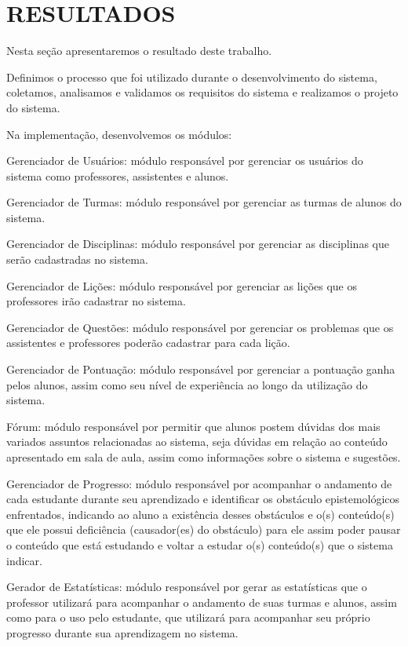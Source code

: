 \chapter{RESULTADOS}
\label{chap:resultados}

Nesta seção apresentaremos o resultado deste trabalho.

Definimos o processo que foi utilizado durante o desenvolvimento do sistema, coletamos, analisamos e validamos os requisitos do sistema e realizamos o projeto do sistema. 

Na implementação, desenvolvemos os módulos: 

\begin{alineascomponto}
    \item Gerenciador de Usuários: módulo responsável por gerenciar os usuários do sistema como professores, assistentes e alunos.
    \item Gerenciador de Turmas: módulo responsável por gerenciar as turmas de alunos do sistema.
    \item Gerenciador de Disciplinas: módulo responsável por gerenciar as disciplinas que serão cadastradas no sistema.
    \item Gerenciador de Lições: módulo responsável por gerenciar as lições que os professores irão cadastrar no sistema.
    \item Gerenciador de Questões: módulo responsável por gerenciar os problemas que os assistentes e professores poderão cadastrar para cada lição.
    \item Gerenciador de Pontuação: módulo responsável por gerenciar a pontuação ganha pelos alunos, assim como seu nível de experiência ao longo da utilização do sistema. 
    \item Fórum: módulo responsável por permitir que alunos postem dúvidas dos mais variados  assuntos relacionadas ao sistema, seja dúvidas em relação ao conteúdo apresentado em sala de aula, assim como informações sobre o sistema e sugestões.
    \item Gerenciador de Progresso: módulo responsável por acompanhar o andamento de cada estudante durante seu aprendizado e identificar os obstáculo epistemológicos enfrentados, indicando ao aluno 
a exist\^encia desses obst\'aculos e o(s) conte\'udo(s) que ele possui defici\^encia (causador(es) do obstáculo) para ele assim poder pausar o conte\'udo que est\'a estudando e voltar a 
estudar o(s) conte\'udo(s) que o sistema indicar.
	\item Gerador de Estatísticas: módulo responsável por gerar as estatísticas que o professor utilizará para acompanhar o andamento de suas turmas e alunos, assim como para o uso pelo estudante, 
que utilizará para acompanhar seu próprio progresso durante sua aprendizagem no sistema. 
\end{alineascomponto}

